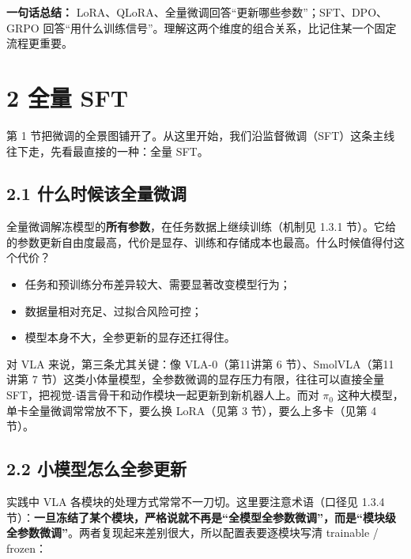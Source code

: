 \documentclass[
  chinese,
]{ctexart}
\providecommand{\tightlist}{%
  \setlength{\itemsep}{0pt}\setlength{\parskip}{0pt}}
\begin{document}
\textbf{一句话总结：}
LoRA、QLoRA、全量微调回答``更新哪些参数''；SFT、DPO、GRPO
回答``用什么训练信号''。理解这两个维度的组合关系，比记住某一个固定流程更重要。

\section{2 全量 SFT}\label{ux5168ux91cf-sft}

第 1
节把微调的全景图铺开了。从这里开始，我们沿监督微调（SFT）这条主线往下走，先看最直接的一种：全量
SFT。

\subsection{2.1
什么时候该全量微调}\label{ux4ec0ux4e48ux65f6ux5019ux8be5ux5168ux91cfux5faeux8c03}

全量微调解冻模型的\textbf{所有参数}，在任务数据上继续训练（机制见 1.3.1
节）。它给的参数更新自由度最高，代价是显存、训练和存储成本也最高。什么时候值得付这个代价？

\begin{itemize}
\tightlist
\item
  任务和预训练分布差异较大、需要显著改变模型行为；
\item
  数据量相对充足、过拟合风险可控；
\item
  模型本身不大，全参更新的显存还扛得住。
\end{itemize}

对 VLA 来说，第三条尤其关键：像 VLA-0（第11讲第 6
节）、SmolVLA（第11讲第 7
节）这类小体量模型，全参数微调的显存压力有限，往往可以直接全量
SFT，把视觉-语言骨干和动作模块一起更新到新机器人上。而对 \(\pi_0\)
这种大模型，单卡全量微调常常放不下，要么换 LoRA（见第 3
节），要么上多卡（见第 4 节）。

\subsection{2.2
小模型怎么全参更新}\label{ux5c0fux6a21ux578bux600eux4e48ux5168ux53c2ux66f4ux65b0}

实践中 VLA 各模块的处理方式常常不一刀切。这里要注意术语（口径见 1.3.4
节）：\textbf{一旦冻结了某个模块，严格说就不再是``全模型全参数微调''，而是``模块级全参数微调''}。两者复现起来差别很大，所以配置表要逐模块写清
trainable / frozen：
\end{document}
